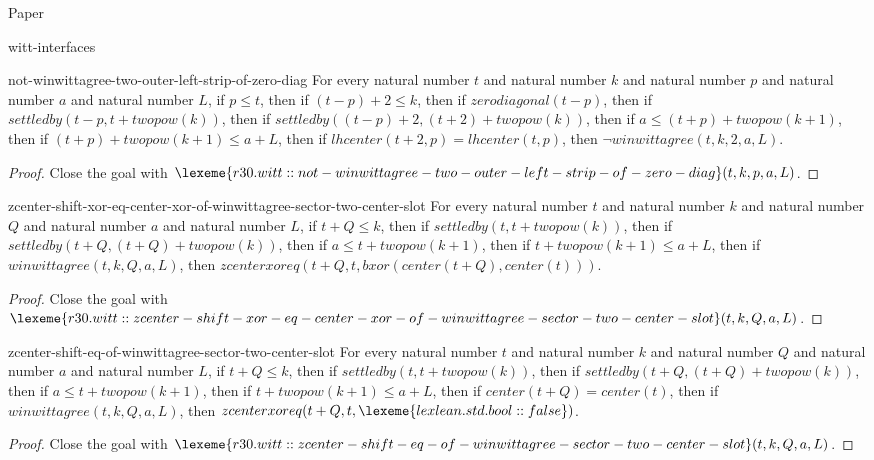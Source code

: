 \begin{lexlean}{Paper}
\begin{section}{witt-interfaces}
  \begin{theorem}{not-winwittagree-two-outer-left-strip-of-zero-diag}
  For every natural number \(t\) and natural number \(k\) and natural number \(p\) and natural number \(a\) and natural number \(L\), if \(p ≤ t\), then if \((t - p) + 2 ≤ k\), then if \(zerodiagonal(t - p)\), then if \(settledby(t - p, t + twopow(k))\), then if \(settledby((t - p) + 2, (t + 2) + twopow(k))\), then if \(a ≤ (t + p) + twopow(k + 1)\), then if \((t + p) + twopow(k + 1) ≤ a + L\), then if \(lhcenter(t + 2, p) = lhcenter(t, p)\), then \(¬ winwittagree(t, k, 2, a, L)\).
  \begin{proof}
  Close the goal with \(\lexeme{r30.witt::not-winwittagree-two-outer-left-strip-of-zero-diag}(t, k, p, a, L)\).
  \end{proof}
  \end{theorem}

  \begin{theorem}{zcenter-shift-xor-eq-center-xor-of-winwittagree-sector-two-center-slot}
  For every natural number \(t\) and natural number \(k\) and natural number \(Q\) and natural number \(a\) and natural number \(L\), if \(t + Q ≤ k\), then if \(settledby(t, t + twopow(k))\), then if \(settledby(t + Q, (t + Q) + twopow(k))\), then if \(a ≤ t + twopow(k + 1)\), then if \(t + twopow(k + 1) ≤ a + L\), then if \(winwittagree(t, k, Q, a, L)\), then \(zcenterxoreq(t + Q, t, bxor(center(t + Q), center(t)))\).
  \begin{proof}
  Close the goal with \(\lexeme{r30.witt::zcenter-shift-xor-eq-center-xor-of-winwittagree-sector-two-center-slot}(t, k, Q, a, L)\).
  \end{proof}
  \end{theorem}

  \begin{theorem}{zcenter-shift-eq-of-winwittagree-sector-two-center-slot}
  For every natural number \(t\) and natural number \(k\) and natural number \(Q\) and natural number \(a\) and natural number \(L\), if \(t + Q ≤ k\), then if \(settledby(t, t + twopow(k))\), then if \(settledby(t + Q, (t + Q) + twopow(k))\), then if \(a ≤ t + twopow(k + 1)\), then if \(t + twopow(k + 1) ≤ a + L\), then if \(center(t + Q) = center(t)\), then if \(winwittagree(t, k, Q, a, L)\), then \(zcenterxoreq(t + Q, t, \lexeme{lexlean.std.bool::false})\).
  \begin{proof}
  Close the goal with \(\lexeme{r30.witt::zcenter-shift-eq-of-winwittagree-sector-two-center-slot}(t, k, Q, a, L)\).
  \end{proof}
  \end{theorem}


\end{section}
\end{lexlean}
